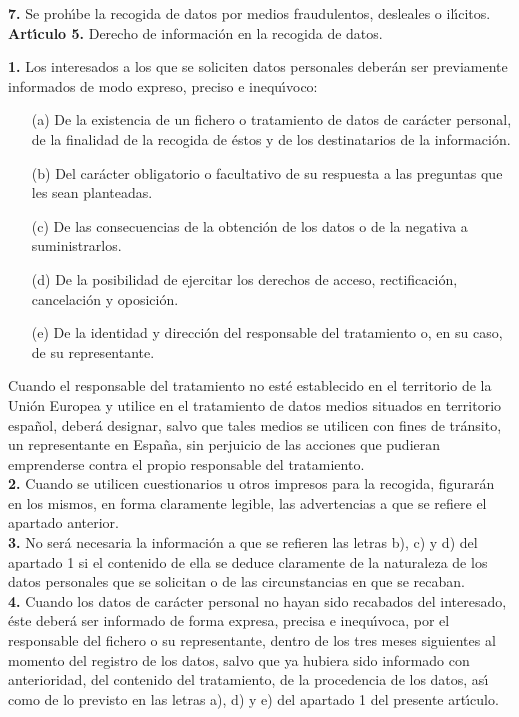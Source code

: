 {\bf 7.} Se proh\'{\i}be la recogida de datos por medios fraudulentos, 
desleales o il\'{\i}citos.
\vspace{0.3cm}\\
{\large {\bf Art\'{\i}culo 5.} Derecho de informaci\'on en la recogida de 
datos.}

{\bf 1.} Los interesados a los que se soliciten datos personales deber\'an ser 
previamente informados de modo expreso, preciso e inequ\'{\i}voco:
\begin{itemize}
\item [(a)] De la existencia de un fichero o tratamiento de datos de car\'acter 
personal, de la finalidad de la recogida de \'estos y de los destinatarios de 
la informaci\'on.
\item [(b)] Del car\'acter obligatorio o facultativo de su respuesta a las 
preguntas que les sean planteadas.
\item [(c)] De las consecuencias de la obtenci\'on de los datos o de la 
negativa a suministrarlos.
\item [(d)] De la posibilidad de ejercitar los derechos de acceso, 
rectificaci\'on, cancelaci\'on y oposici\'on.
\item [(e)] De la identidad y direcci\'on del responsable del tratamiento o,
en su caso, de su representante.
\end{itemize}
Cuando el responsable del tratamiento no est\'e establecido en el territorio de 
la Uni\'on Europea y utilice en el tratamiento de datos medios situados en 
territorio espa\~nol, deber\'a designar, salvo que tales medios se utilicen con 
fines de tr\'ansito, un representante en Espa\~na, sin perjuicio de las 
acciones que pudieran emprenderse contra el propio responsable del 
tratamiento.\\

{\bf 2.} Cuando se utilicen cuestionarios u otros impresos para la recogida,
figurar\'an en los mismos, en forma claramente legible, las advertencias a que 
se refiere el apartado anterior.\\

{\bf 3.} No ser\'a necesaria la informaci\'on a que se refieren las letras b),
c) y d) del apartado 1 si el contenido de ella se deduce claramente de la 
naturaleza de los datos personales que se solicitan o de las circunstancias en 
que se recaban.\\

{\bf 4.} Cuando los datos de car\'acter personal no hayan sido recabados del 
interesado, \'este deber\'a ser informado de forma expresa, precisa e 
inequ\'{\i}voca, por el responsable del fichero o su representante, dentro de 
los tres meses siguientes al momento del registro de los datos, salvo que ya 
hubiera sido informado con anterioridad, del contenido del tratamiento, de la 
procedencia de los datos, as\'{\i} como de lo previsto en las letras a), d) y 
e) del apartado 1 del presente art\'{\i}culo.\\

